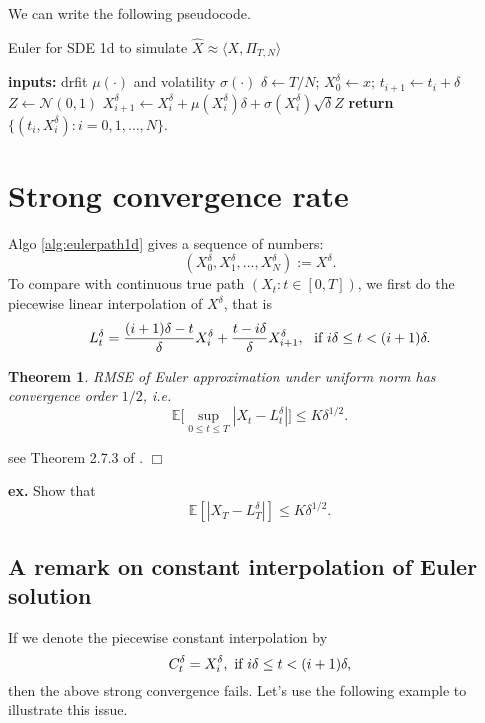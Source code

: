 \documentclass{article}
\newtheorem{theorem}{Theorem}
\newenvironment{proof}{\noindent {\sc Proof:}}{$\Box$} %
\begin{document}
We can write the following pseudocode.
\begin{algorithm}
\caption{Euler for SDE 1d to simulate $\hat X \approx \langle X, \Pi_{T,N}\rangle$}
\label{alg:eulerpath1d}
\begin{algorithmic}[1]
\State \textbf{inputs:} drfit $\mu(\cdot)$ and volatility $\sigma(\cdot)$
\State {}
\State  $\delta \gets T/N$; $X_{0}^{\delta} \gets x$; 
	\State $t_{i+1} \gets t_i + \delta$
	\State $Z \gets \mathcal N(0,1)$
	\State $X_{i+1}^\delta \gets X_i^\delta + \mu(X_i^\delta) \delta + \sigma(X_i^\delta) \sqrt{\delta} Z$
\EndFor
\State \textbf{return} $\{(t_i, X_i^\delta): i = 0, 1, \ldots, N\}$. 
\EndProcedure
\end{algorithmic}
\end{algorithm}

 

\section{Strong convergence rate}
Algo \ref{alg:eulerpath1d} gives a sequence of numbers:
$$(X_{0}^{\delta}, X_{1}^{\delta}, \ldots, X_{N}^{\delta}) := X^{\delta}.$$
To compare with continuous true path $(X_{t}: t\in [0,T])$, we first do the piecewise linear interpolation of $X^{\delta}$, that is
$$L^{\delta}_{t} = \frac{(i+1)\delta - t}{\delta} X_{i}^{\delta} 
+ \frac{t - i\delta}{\delta} X_{i+1}^{\delta}, \ \hbox{ if } 
i\delta \le t < (i+1)\delta.$$

\begin{theorem}
 RMSE of Euler approximation 
 under uniform norm has convergence order $1/2$, i.e.
 $$\mathbb E \Big [\sup_{0 \le t\le T} |X_{t} - L_{t}^{\delta}| \Big] \le K \delta^{1/2}.$$
\end{theorem}
\begin{proof}
 see Theorem 2.7.3 of \cite{Mao07}.
\end{proof}

{\bf ex.} Show that 
$$\mathbb E [ |X_{T} - L_{T}^{\delta} | ] \le K \delta^{1/2}.$$

\subsection{A remark on constant interpolation of Euler solution}
If we denote the piecewise constant interpolation by
$$C_{t}^{\delta} = 
X_{i}^{\delta}, \hbox{ if } i\delta \le t < (i+1) \delta, $$
then the above strong convergence fails. Let's use the following example to illustrate this issue.
\end{document}
